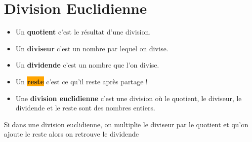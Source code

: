 
\section{Division Euclidienne}
\begin{definition}[Vocabulaire]
\begin{itemize}
\item Un \colorbox{red!30}{\textbf{quotient}} c'est le résultat d'une division.
\item Un \colorbox{green!30}{\textbf{diviseur}} c'est un nombre par lequel on divise.
\item Un \colorbox{blue!30}{\textbf{dividende}} c'est un nombre que l'on divise.
\item Un \colorbox{orange}{\textbf{reste}} c'est ce qu'il reste après partage !
\item Une \textbf{division euclidienne} c'est une division où le quotient, le diviseur, le dividende et le reste sont des nombres entiers.
\end{itemize}
\end{definition}

\begin{propriete}[\admise]
	Si dans une division euclidienne, on multiplie le diviseur par le quotient et qu'on ajoute le reste
	alors on retrouve le dividende
\end{propriete}

